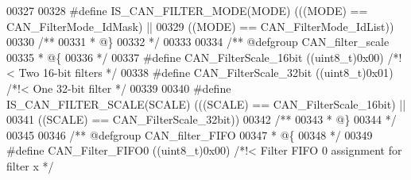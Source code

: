 \begin{DoxyCode}
00327 
00328 \textcolor{preprocessor}{#}\textcolor{preprocessor}{define} \textcolor{preprocessor}{IS\_CAN\_FILTER\_MODE}\textcolor{preprocessor}{(}\textcolor{preprocessor}{MODE}\textcolor{preprocessor}{)} \textcolor{preprocessor}{(}\textcolor{preprocessor}{(}\textcolor{preprocessor}{(}\textcolor{preprocessor}{MODE}\textcolor{preprocessor}{)} \textcolor{preprocessor}{==} CAN_FilterMode_IdMask\textcolor{preprocessor}{)} \textcolor{preprocessor}{||}
00329                                   \textcolor{preprocessor}{(}\textcolor{preprocessor}{(}\textcolor{preprocessor}{MODE}\textcolor{preprocessor}{)} \textcolor{preprocessor}{==} CAN_FilterMode_IdList\textcolor{preprocessor}{)}\textcolor{preprocessor}{)}
00330 \textcolor{comment}{/**}
00331 \textcolor{comment}{  * @\}}
00332 \textcolor{comment}{  */}
00333 
00334 \textcolor{comment}{/** @defgroup CAN\_filter\_scale }
00335 \textcolor{comment}{  * @\{}
00336 \textcolor{comment}{  */}
00337 \textcolor{preprocessor}{#}\textcolor{preprocessor}{define} \textcolor{preprocessor}{CAN\_FilterScale\_16bit}       \textcolor{preprocessor}{(}\textcolor{preprocessor}{(}\textcolor{preprocessor}{uint8\_t}\textcolor{preprocessor}{)}0x00\textcolor{preprocessor}{)} \textcolor{comment}{/*!< Two 16-bit filters */}
00338 \textcolor{preprocessor}{#}\textcolor{preprocessor}{define} \textcolor{preprocessor}{CAN\_FilterScale\_32bit}       \textcolor{preprocessor}{(}\textcolor{preprocessor}{(}\textcolor{preprocessor}{uint8\_t}\textcolor{preprocessor}{)}0x01\textcolor{preprocessor}{)} \textcolor{comment}{/*!< One 32-bit filter */}
00339 
00340 \textcolor{preprocessor}{#}\textcolor{preprocessor}{define} \textcolor{preprocessor}{IS\_CAN\_FILTER\_SCALE}\textcolor{preprocessor}{(}\textcolor{preprocessor}{SCALE}\textcolor{preprocessor}{)} \textcolor{preprocessor}{(}\textcolor{preprocessor}{(}\textcolor{preprocessor}{(}\textcolor{preprocessor}{SCALE}\textcolor{preprocessor}{)} \textcolor{preprocessor}{==} CAN_FilterScale_16bit\textcolor{preprocessor}{)} \textcolor{preprocessor}{||}
00341                                     \textcolor{preprocessor}{(}\textcolor{preprocessor}{(}\textcolor{preprocessor}{SCALE}\textcolor{preprocessor}{)} \textcolor{preprocessor}{==} CAN_FilterScale_32bit\textcolor{preprocessor}{)}\textcolor{preprocessor}{)}
00342 \textcolor{comment}{/**}
00343 \textcolor{comment}{  * @\}}
00344 \textcolor{comment}{  */}
00345 
00346 \textcolor{comment}{/** @defgroup CAN\_filter\_FIFO}
00347 \textcolor{comment}{  * @\{}
00348 \textcolor{comment}{  */}
00349 \textcolor{preprocessor}{#}\textcolor{preprocessor}{define} \textcolor{preprocessor}{CAN\_Filter\_FIFO0}             \textcolor{preprocessor}{(}\textcolor{preprocessor}{(}\textcolor{preprocessor}{uint8\_t}\textcolor{preprocessor}{)}0x00\textcolor{preprocessor}{)}  \textcolor{comment}{/*!< Filter FIFO 0 assignment for filter x */}

\end{DoxyCode}
